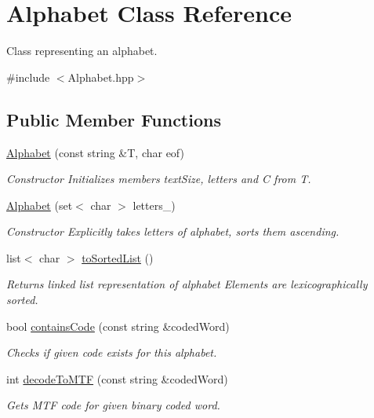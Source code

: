 \hypertarget{class_alphabet}{\section{\-Alphabet \-Class \-Reference}
\label{class_alphabet}
}


\-Class representing an alphabet.  




{\ttfamily \#include $<$\-Alphabet.\-hpp$>$}

\subsection*{\-Public \-Member \-Functions}
\begin{DoxyCompactItemize}
\item 
\hyperlink{class_alphabet_a7a32c28f82e6dde155795f2602721359}{\-Alphabet} (const string \&\-T, char eof)
\begin{DoxyCompactList}\small\item\em \-Constructor \-Initializes members text\-Size, letters and \-C from \-T. \end{DoxyCompactList}\item 
\hyperlink{class_alphabet_a366d7084c19e7e0733bbc33e6319d8d6}{\-Alphabet} (set$<$ char $>$ letters\-\_\-)
\begin{DoxyCompactList}\small\item\em \-Constructor \-Explicitly takes letters of alphabet, sorts them ascending. \end{DoxyCompactList}\item 
list$<$ char $>$ \hyperlink{class_alphabet_a484d9a2c3b1404e566a1dad181853cd6}{to\-Sorted\-List} ()
\begin{DoxyCompactList}\small\item\em \-Returns linked list representation of alphabet \-Elements are lexicographically sorted. \end{DoxyCompactList}\item 
bool \hyperlink{class_alphabet_af11bc49f984b6f62d835cdd3e8a3edc3}{contains\-Code} (const string \&coded\-Word)
\begin{DoxyCompactList}\small\item\em \-Checks if given code exists for this alphabet. \end{DoxyCompactList}\item 
int \hyperlink{class_alphabet_a6a2f6ba1c9e3bb6201ba40eb4e58b629}{decode\-To\-M\-T\-F} (const string \&coded\-Word)
\begin{DoxyCompactList}\small\item\em \-Gets \-M\-T\-F code for given binary coded word. \end{DoxyCompactList}\item 

\end{DoxyCompactItemize}
